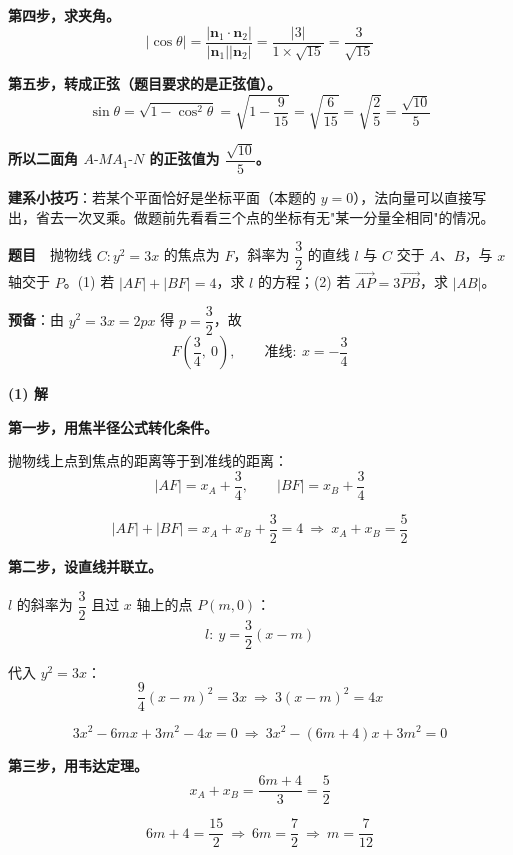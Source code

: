 \textbf{第四步，求夹角。}
\[\left|\cos\theta\right|=\frac{\left|\boldsymbol n_1\cdot\boldsymbol n_2\right|}{\left|\boldsymbol n_1\right|\left|\boldsymbol n_2\right|}=\frac{|3|}{1\times\sqrt{15}}=\frac3{\sqrt{15}}\]

\textbf{第五步，转成正弦（题目要求的是正弦值）。}
\[\sin\theta=\sqrt{1-\cos^{2}\theta}=\sqrt{1-\frac9{15}}=\sqrt{\frac6{15}}=\sqrt{\frac25}=\frac{\sqrt{10}}5\]

\textbf{所以二面角 $A\text{-}MA_1\text{-}N$ 的正弦值为 $\dfrac{\sqrt{10}}5$。}

\begin{gktip}
\textbf{建系小技巧}：若某个平面恰好是坐标平面（本题的 $y=0$），法向量可以直接写出，省去一次叉乘。做题前先看看三个点的坐标有无"某一分量全相同"的情况。
\end{gktip}

\par\medskip


\textbf{题目}　抛物线 $C:y^{2}=3x$ 的焦点为 $F$，斜率为 $\dfrac32$ 的直线 $l$ 与 $C$ 交于 $A$、$B$，与 $x$ 轴交于 $P$。(1) 若 $|AF|+|BF|=4$，求 $l$ 的方程；(2) 若 $\overrightarrow{AP}=3\overrightarrow{PB}$，求 $|AB|$。

\par\medskip

\textbf{预备}：由 $y^{2}=3x=2px$ 得 $p=\dfrac32$，故
\[F\left(\frac34,\ 0\right),\qquad \text{准线}:\ x=-\frac34\]

\par\medskip

\textbf{(1) 解}

\textbf{第一步，用焦半径公式转化条件。}

抛物线上点到焦点的距离等于到准线的距离：
\[|AF|=x_A+\frac34,\qquad |BF|=x_B+\frac34\]

\[|AF|+|BF|=x_A+x_B+\frac32=4\ \Longrightarrow\ x_A+x_B=\frac52\]

\textbf{第二步，设直线并联立。}

$l$ 的斜率为 $\dfrac32$ 且过 $x$ 轴上的点 $P(m,0)$：
\[l:\ y=\frac32(x-m)\]

代入 $y^{2}=3x$：
\[\frac94(x-m)^{2}=3x\ \Longrightarrow\ 3(x-m)^{2}=4x\]

\[3x^{2}-6mx+3m^{2}-4x=0\ \Longrightarrow\ 3x^{2}-(6m+4)x+3m^{2}=0\]

\textbf{第三步，用韦达定理。}
\[x_A+x_B=\frac{6m+4}3=\frac52\]

\[6m+4=\frac{15}2\ \Longrightarrow\ 6m=\frac72\ \Longrightarrow\ m=\frac7{12}\]

